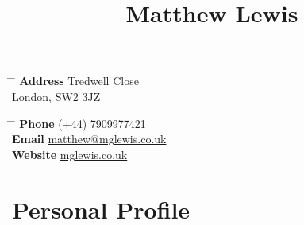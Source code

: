 \documentclass[10pt]{article}
\begin{document}

\title{Matthew Lewis}


\parbox{0.5\textwidth}{
\begin{tabbing}
\hspace{3cm} \= \hspace{4cm} \= \kill
{\bf Address}  Tredwell Close \\
\> London, SW2 3JZ \\
\end{tabbing}}
\hfill
\parbox{0.5\textwidth}{ 
\begin{tabbing}
\hspace{3cm} \= \hspace{4cm} \= \kill 
{\bf Phone} \> (+44) 7909977421 \\ 
{\bf Email} \> \href{mailto:matthew@mglewis.co.uk}{matthew@mglewis.co.uk} \\ %
{\bf Website} \> \href{http://www.mglewis.co.uk}{mglewis.co.uk}
\end{tabbing}}



\section{Personal Profile}
\end{document}
